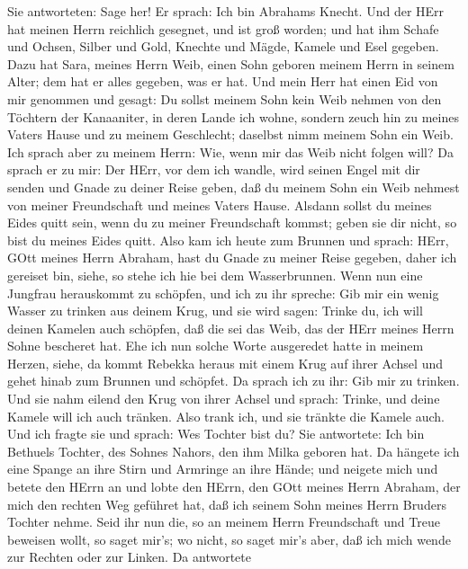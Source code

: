 Sie antworteten: Sage her!  Er sprach: Ich bin Abrahams
Knecht.  Und der HErr hat meinen Herrn reichlich gesegnet,
und ist groß worden; und hat ihm Schafe und Ochsen, Silber und Gold,
Knechte und Mägde, Kamele und Esel gegeben.  Dazu hat Sara,
meines Herrn Weib, einen Sohn geboren meinem Herrn in seinem Alter; dem
hat er alles gegeben, was er hat.  Und mein Herr hat einen
Eid von mir genommen und gesagt: Du sollst meinem Sohn kein Weib nehmen
von den Töchtern der Kanaaniter, in deren Lande ich wohne, 
sondern zeuch hin zu meines Vaters Hause und zu meinem Geschlecht;
daselbst nimm meinem Sohn ein Weib.  Ich sprach aber zu
meinem Herrn: Wie, wenn mir das Weib nicht folgen will?  Da
sprach er zu mir: Der HErr, vor dem ich wandle, wird seinen Engel mit
dir senden und Gnade zu deiner Reise geben, daß du meinem Sohn ein Weib
nehmest von meiner Freundschaft und meines Vaters Hause. 
Alsdann sollst du meines Eides quitt sein, wenn du zu meiner
Freundschaft kommst; geben sie dir nicht, so bist du meines Eides quitt.
 Also kam ich heute zum Brunnen und sprach: HErr, GOtt
meines Herrn Abraham, hast du Gnade zu meiner Reise gegeben, daher ich
gereiset bin,  siehe, so stehe ich hie bei dem
Wasserbrunnen. Wenn nun eine Jungfrau herauskommt zu schöpfen, und ich
zu ihr spreche: Gib mir ein wenig Wasser zu trinken aus deinem Krug,
 und sie wird sagen: Trinke du, ich will deinen Kamelen
auch schöpfen, daß die sei das Weib, das der HErr meines Herrn Sohne
bescheret hat.  Ehe ich nun solche Worte ausgeredet hatte
in meinem Herzen, siehe, da kommt Rebekka heraus mit einem Krug auf
ihrer Achsel und gehet hinab zum Brunnen und schöpfet. Da sprach ich zu
ihr: Gib mir zu trinken.  Und sie nahm eilend den Krug von
ihrer Achsel und sprach: Trinke, und deine Kamele will ich auch tränken.
Also trank ich, und sie tränkte die Kamele auch.  Und ich
fragte sie und sprach: Wes Tochter bist du? Sie antwortete: Ich bin
Bethuels Tochter, des Sohnes Nahors, den ihm Milka geboren hat. Da
hängete ich eine Spange an ihre Stirn und Armringe an ihre Hände;
 und neigete mich und betete den HErrn an und lobte den
HErrn, den GOtt meines Herrn Abraham, der mich den rechten Weg geführet
hat, daß ich seinem Sohn meines Herrn Bruders Tochter nehme.
 Seid ihr nun die, so an meinem Herrn Freundschaft und
Treue beweisen wollt, so saget mir's; wo nicht, so saget mir's aber, daß
ich mich wende zur Rechten oder zur Linken.  Da antwortete
